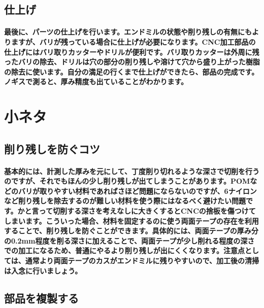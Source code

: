 \documentclass[b5paper, 9pt, twocolumn, titlepage,openany]{jsbook}%
\begin{document}

\subsection{仕上げ}
\paragraph{最後に、パーツの仕上げを行います。エンドミルの状態や削り残しの有無にもよりますが、バリが残っている場合に仕上げが必要になります。CNC加工部品の仕上げにはバリ取りカッターやドリルが便利です。バリ取りカッターは外周に残ったバリの除去、ドリルは穴の部分の削り残しや溶けて穴から盛り上がった樹脂の除去に使います。自分の満足の行くまで仕上げができたら、部品の完成です。ノギスで測ると、厚み精度も出ていることがわかります。}


\section{小ネタ}
\subsection{削り残しを防ぐコツ}
\paragraph{基本的には、計測した厚みを元にして、丁度削り切れるような深さで切削を行うのですが、それでもほんの少し削り残しが出てしまうことがあります。POMなどのバリが取りやすい材料であればさほど問題にならないのですが、6ナイロンなど削り残しを除去するのが難しい材料を使う際にはなるべく避けたい問題です。かと言って切削する深さを考えなしに大きくするとCNCの捨板を傷つけてしまいます。こういった場合、材料を固定するのに使う両面テープの存在を利用することで、削り残しを防ぐことができます。具体的には、両面テープの厚み分の0.2mm程度を削る深さに加えることで、両面テープが少し削れる程度の深さでの加工になるため、普通にやるより削り残しが出にくくなります。注意点としては、通常より両面テープのカスがエンドミルに残りやすいので、加工後の清掃は入念に行いましょう。}

\subsection{部品を複製する}
\end{document}
